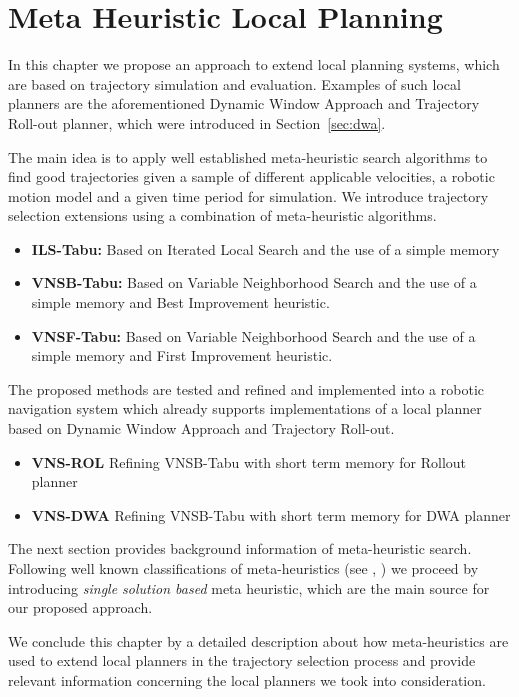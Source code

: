 \chapter{Meta Heuristic Local Planning}\label{ch:meta}

In this chapter we propose an approach to extend local planning systems, which are based on trajectory simulation and evaluation. Examples of such local planners are the aforementioned Dynamic Window Approach and Trajectory Roll-out planner, which were introduced in Section~\ref{sec:dwa}.

The main idea is to apply well established meta-heuristic search algorithms to find good trajectories given a sample of different applicable velocities, a robotic motion model and a given time period for simulation. We introduce trajectory selection extensions using a combination of meta-heuristic algorithms.

\begin{itemize}
\item{\bf{ILS-Tabu:}}  Based on Iterated Local Search and the use of a simple memory
\item{\bf{VNSB-Tabu:}} Based on Variable Neighborhood Search and the use of a simple memory and Best Improvement heuristic.
\item{\bf{VNSF-Tabu:}} Based on Variable Neighborhood Search and the use of a simple memory and First Improvement heuristic.
\end{itemize}

The proposed methods are tested and refined and implemented into a robotic navigation system which already supports implementations of a local planner based on Dynamic Window Approach and Trajectory Roll-out.

\begin{itemize}
\item{\bf{VNS-ROL}} Refining VNSB-Tabu with short term memory for Rollout planner
\item{\bf{VNS-DWA}} Refining VNSB-Tabu with short term memory for DWA planner
\end{itemize}

The next section provides background information of meta-heuristic search. Following well known classifications of meta-heuristics (see \cite{blum2003metaheuristics}, \cite{birattari2001classification} ) we proceed by introducing \emph{single solution based} meta heuristic, which are the main source for our proposed approach. 

We conclude this chapter by a detailed description about how meta-heuristics are used to extend local planners in the trajectory selection process and provide relevant information concerning the local planners we took into consideration. 

